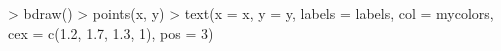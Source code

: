 \begin{Schunk}
\begin{Sinput}
> bdraw()
> points(x, y)
> text(x = x, y = y, labels = labels, col = mycolors, cex = c(1.2, 1.7, 1.3, 1), pos = 3)
\end{Sinput}
\end{Schunk}
